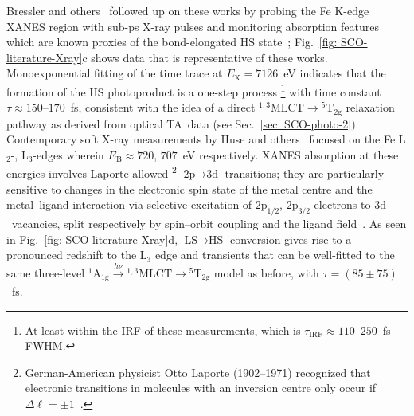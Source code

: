 Bressler and others~\cite{Bressler2009, Lemke2013, Cammarata2014} followed up
on these works by probing the Fe K-edge XANES region with sub-ps X-ray pulses
and monitoring absorption features which are known
proxies of the bond-elongated HS state~\cite{Hannay1997, Briois2001};
Fig.~\ref{fig: SCO-literature-Xray}c shows data that is representative of these works.
Monoexponential fitting of the time trace at $E_\text{X} = 7126$~eV indicates that
the formation of the HS photoproduct is a one-step process%
\footnote{At least within the IRF of these measurements,
which is $\tau_\text{IRF} \approx 110$--$250$~fs FWHM.}
with time constant~$\tau \approx 150$--$170$~fs,
consistent with the idea of a direct $\mathrm{^{1,3} MLCT} \rightarrow \mathrm{^5 T_{2g}}$
relaxation pathway as derived from optical TA~data (see Sec.~\ref{sec: SCO-photo-2}).
%
Contemporary soft X-ray measurements by Huse and others~\cite{Huse2010, Huse2011, Hong2015}
focused on the Fe L$_2$-, L$_3$-edges wherein $E_\text{B} \approx 720$, $707$~eV respectively.
XANES absorption at these energies involves Laporte-allowed%
\footnote{German-American physicist Otto Laporte (1902--1971) recognized that
electronic transitions in molecules with an inversion centre only occur if
$\Delta \ell = \pm 1$~\cite{LaporteMemoir, Laporte1925, Harris1978}.}
$\text{2p} \rightarrow \text{3d}$ transitions; they are particularly sensitive to
changes in the electronic spin state of the metal centre and the metal--ligand interaction
via selective excitation of $\mathrm{2p}_{1/2}$, $\mathrm{2p}_{3/2}$ electrons
to $\text{3d}$~vacancies, split respectively by spin--orbit coupling
and the ligand field~\cite{Briois1995}.
%
As seen in Fig.~\ref{fig: SCO-literature-Xray}d,
$\text{LS} \rightarrow \text{HS}$ conversion gives rise to a pronounced redshift to the L$_3$ edge
and transients that can be well-fitted to the same three-level
$\mathrm{^1 A_{1g}} \xrightarrow[]{h \nu} \mathrm{^{1,3} MLCT} \rightarrow \mathrm{^5 T_{2g}}$
model as before, with $\tau = (85 \pm 75)$~fs.

